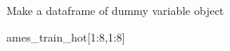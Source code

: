 \documentclass[
  10pt,
  ignorenonframetext,
]{beamer}
\newenvironment{Shaded}{}{}
\newcommand{\DecValTok}[1]{#1}
\newcommand{\KeywordTok}[1]{\textcolor[rgb]{0.00,0.00,1.00}{#1}}
\newcommand{\NormalTok}[1]{#1}
\newcommand{\OperatorTok}[1]{#1}
\begin{document}
\begin{frame}[fragile]{Make a dataframe of dummy variable object}
\protect\hypertarget{make-a-dataframe-of-dummy-variable-object}{}

\begin{Shaded}
\end{Shaded}

\begin{Shaded}
\begin{Highlighting}[]
\NormalTok{ames_train_hot[}\DecValTok{1}\OperatorTok{:}\DecValTok{8}\NormalTok{,}\DecValTok{1}\OperatorTok{:}\DecValTok{8}\NormalTok{]}
\end{Highlighting}
\end{Shaded}


\end{frame}
\end{document}

